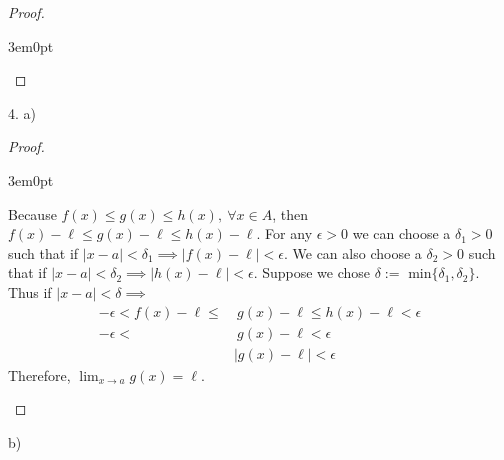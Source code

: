 \documentclass[11pt]{article}
\newenvironment{myproof}
{\begin{proof} \begin{adjustwidth}{3em}{0pt}$ $\par\nobreak\ignorespaces}
{\end{adjustwidth} \end{proof}}
\begin{document}
\begin{flushleft}
\begin{myproof}
\end{myproof}

\newpage

4. a)
\begin{myproof}
Because $f(x) \leq g(x) \leq h(x), \ \forall x \in A$, then $f(x) - \ell \leq g(x) - \ell \leq h(x) - \ell$. For any $\epsilon > 0$ we can choose a $\delta_1 > 0$ such that if $|x-a|<\delta_1 \implies |f(x) - \ell| < \epsilon$. We can also choose a $\delta_2 > 0$ such that if $|x-a|< \delta_2 \implies |h(x) -\ell| < \epsilon$. Suppose we chose $\delta := \text{ min}\{ \delta_1 , \delta_2 \}$. Thus if $|x-a| < \delta \implies$ 
\begin{align*}
-\epsilon < f(x) - \ell \leq & \ g(x) - \ell \leq h(x) - \ell < \epsilon \\
-\epsilon < & \ g(x) - \ell < \epsilon \\
& |g(x) - \ell| < \epsilon
\end{align*}
Therefore, $\lim_{x\to a} g(x) = \ell$.
\end{myproof}

b)


\end{flushleft}
\end{document}
